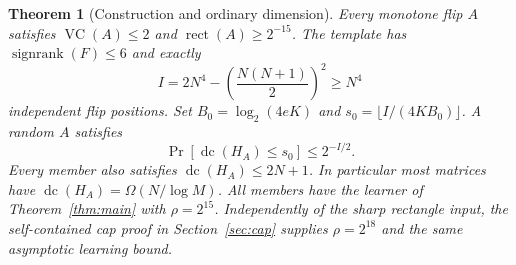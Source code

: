 \documentclass[11pt]{article}
\newtheorem{theorem}{Theorem}
\DeclareMathOperator{\dc}{dc}
\DeclareMathOperator{\sr}{signrank}
\DeclareMathOperator{\rect}{rect}
\newcommand{\1}{\mathbf 1}
\begin{document}
\begin{theorem}[Construction and ordinary dimension]\label{thm:construction}
Every monotone flip $A$ satisfies $\operatorname{VC}(A)\le2$ and $\rect(A)\ge2^{-15}$. The template has $\sr(F)\le6$ and exactly
\begin{equation}\label{eq:I}
 I=2N^4-\left(\frac{N(N+1)}2\right)^2\ge N^4
\end{equation}
independent flip positions. Set $B_0=\log_2(4eK)$ and $s_0=\lfloor I/(4KB_0)\rfloor$. A random $A$ satisfies
\[
 \Pr[\dc(H_A)\le s_0]\le2^{-I/2}.
\]
Every member also satisfies $\dc(H_A)\le2N+1$. In particular most matrices have $\dc(H_A)=\Omega(N/\log M)$. All members have the learner of Theorem~\ref{thm:main} with $\rho=2^{15}$. Independently of the sharp rectangle input, the self-contained cap proof in Section~\ref{sec:cap} supplies $\rho=2^{18}$ and the same asymptotic learning bound.
\end{theorem}
\end{document}
